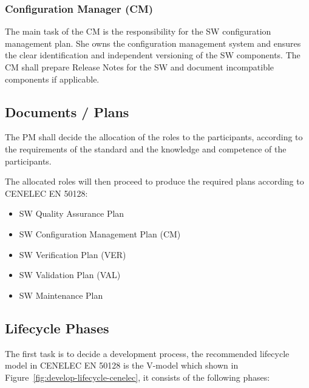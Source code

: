 \subsubsection{Configuration Manager (CM)}
\label{sec:conf-manag}

The main task of the CM is the responsibility for the SW configuration
management plan. She owns the configuration management system and ensures the
clear identification and independent versioning of the SW components. The CM
shall prepare Release Notes for the SW and document incompatible components if
applicable.

\subsection{Documents / Plans}
\label{sec:documents--plan}

The PM shall decide the allocation of the roles to the participants, according
to the requirements of the standard and the knowledge and competence of the
participants.

The allocated roles will then proceed to produce the required plans according to
CENELEC EN 50128:

\begin{itemize}
\item SW Quality Assurance Plan
\item SW Configuration Management Plan (CM)
\item SW Verification Plan (VER)
\item SW Validation Plan (VAL)
\item SW Maintenance Plan
\end{itemize}



\subsection{Lifecycle Phases}
\label{sec:lifecycle-phases}

The first task is to decide a development process, the recommended lifecycle
model in CENELEC EN 50128  is the V-model which shown in
Figure~\ref{fig:develop-lifecycle-cenelec}, it consists of the following phases:

